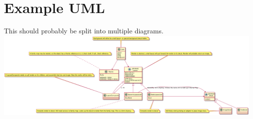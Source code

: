 \documentclass[11pt]{article}
\begin{document}
\section{Example UML}
\label{sec-5}

This should probably be split into multiple diagrams.
\includegraphics[width=.9\linewidth]{InitialCardsUmlqafd.png}
\end{document}
